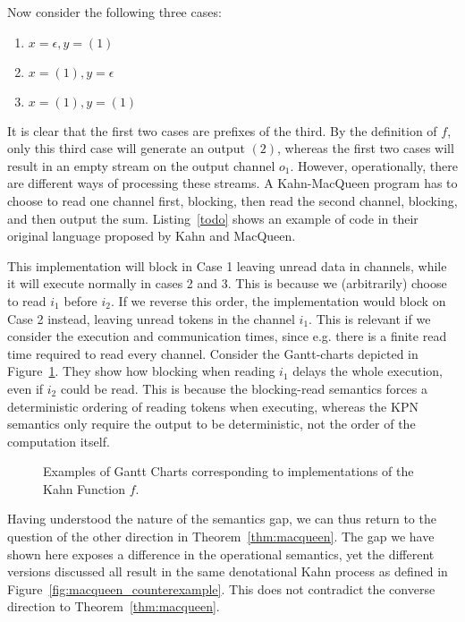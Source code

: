 Now consider the following three cases:
\begin{enumerate}
\item $x = \epsilon, y = (1)$
\item $x = (1), y = \epsilon$
\item $x = (1), y = (1)$
\end{enumerate}

It is clear that the first two cases are prefixes of the third.
By the definition of $f$, only this third case will generate an output $(2)$, whereas the first two cases will result in an empty stream on the output channel $o_1$. 
However, operationally, there are different ways of processing these streams.
A Kahn-MacQueen program has to choose to read one channel first, blocking, then read the second channel, blocking, and then output the sum.
Listing~\ref{todo} shows an example of code in their original language proposed by Kahn and MacQueen.

This implementation will block in Case 1 leaving unread data in channels, while it will execute normally in cases 2 and 3.
This is because we (arbitrarily) choose to read $i_1$ before $i_2$.
If we reverse this order, the implementation would block on Case 2 instead, leaving unread tokens in the channel $i_1$.
This is relevant if we consider the execution and communication times, since e.g. there is a finite read time required to read every channel. 
Consider the Gantt-charts depicted in Figure~\ref{fig:macqueen_example_gantt}. They show how blocking when reading $i_1$ delays the whole execution, even if $i_2$ could be read.
This is because the blocking-read semantics forces a deterministic ordering of reading tokens when executing, whereas the \ac{KPN} semantics only require the output to be deterministic, not the order of the computation itself.

\begin{figure}[h]
   \resizebox{0.85\textwidth}{!}{}
	\caption{Examples of Gantt Charts corresponding to implementations of the Kahn Function $f$.}
	\label{fig:macqueen_example_gantt}
\end{figure}

Having understood the nature of the semantics gap, we can thus return to the question of the other direction in Theorem~\ref{thm:macqueen}.
The gap we have shown here exposes a difference in the operational semantics, yet the different versions discussed all result in the same denotational Kahn process as defined in Figure~\ref{fig:macqueen_counterexample}.
This does not contradict the converse direction to Theorem~\ref{thm:macqueen}.

